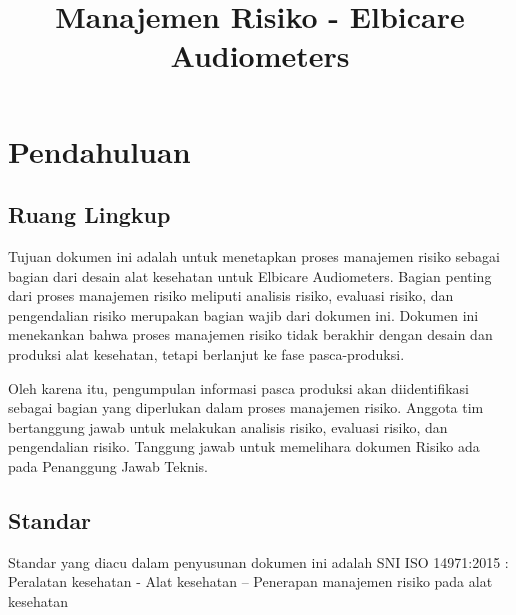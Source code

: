 \documentclass[11pt,a4paper,twoside,onecolumn]{book}
\title{Manajemen Risiko - Elbicare Audiometers}
\begin{document}
	\maketitle
	\renewcommand\contentsname{Daftar Isi}
	\tableofcontents
	
	\renewcommand\listfigurename{Daftar Gambar}
	\listoffigures
	
	\renewcommand\listtablename{Daftar Tabel}
	\listoftables
	\newpage
	
	\renewcommand\chaptername{Bab}
	
	\chapter{Pendahuluan}
		\section{Ruang Lingkup}
		Tujuan dokumen ini adalah untuk menetapkan proses manajemen risiko sebagai bagian dari desain alat kesehatan untuk Elbicare Audiometers. Bagian penting dari proses manajemen risiko meliputi analisis risiko, evaluasi risiko, dan pengendalian risiko merupakan bagian wajib dari
		dokumen ini. Dokumen ini menekankan bahwa proses manajemen risiko tidak berakhir dengan desain dan produksi alat kesehatan, tetapi berlanjut ke fase pasca-produksi. 
		
		Oleh karena itu, pengumpulan informasi pasca produksi akan diidentifikasi sebagai bagian yang diperlukan dalam proses manajemen risiko. Anggota tim bertanggung jawab untuk melakukan analisis risiko, evaluasi risiko, dan pengendalian risiko. Tanggung jawab untuk memelihara dokumen Risiko ada pada Penanggung Jawab Teknis.
		
		\section{Standar}
		Standar yang diacu dalam penyusunan dokumen ini adalah SNI ISO 14971:2015 : Peralatan kesehatan - Alat kesehatan – Penerapan manajemen risiko pada alat kesehatan
		
\end{document}
